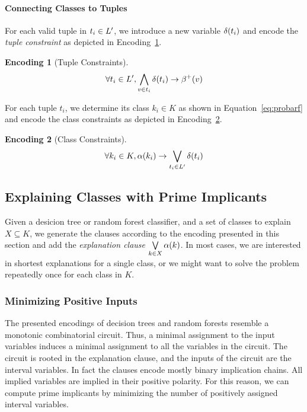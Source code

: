 \documentclass[a4paper, USenglish, cleveref, autoref, thm-restate]{lipics-v2021}
\theoremstyle{definition}
\newtheorem{encoding}{Encoding}[section]
\begin{document}
\paragraph{Connecting Classes to Tuples}

For each valid tuple in $t_i \in L'$, we introduce a new variable $\delta(t_i)$ and encode the \emph{tuple constraint} as depicted in Encoding~\ref{enc:tuple}. 
%
\begin{encoding}[Tuple Constraints]
\label{enc:tuple}
\begin{align*}
\forall t_i \in L', \bigwedge\limits_{v \in t_i} \delta(t_i) \rightarrow \beta^+(v)
\end{align*}
\end{encoding}
%
For each tuple $t_i$, we determine its class $k_i \in K$ as shown in Equation~\ref{eq:probarf} and encode the class constraints as depicted in Encoding~\ref{enc:class-rf}. 
%
\begin{encoding}[Class Constraints]
\label{enc:class-rf}
\begin{align*}
\forall k_i \in K, \alpha(k_i) \rightarrow \bigvee\limits_{t_i \in L'} \delta(t_i)
\end{align*}
\end{encoding}


\subsection{Explaining Classes with Prime Implicants}
\label{sec:approach:pi}

Given a desicion tree or random forest classifier, and a set of classes to explain $X \subseteq K$, we generate the clauses according to the encoding presented in this section and add the \emph{explanation clause} $\bigvee\limits_{k \in X} \alpha(k)$. 
In most cases, we are interested in shortest explanations for a single class, or we might want to solve the problem repeatedly once for each class in $K$. 

\subsubsection{Minimizing Positive Inputs}

The presented encodings of decision trees and random forests resemble a monotonic combinatorial circuit. 
Thus, a minimal assignment to the input variables induces a minimal assignment to all the variables in the circuit. 
The circuit is rooted in the explanation clause, and the inputs of the circuit are the interval variables. 
In fact the clauses encode mostly binary implication chains. 
All implied variables are implied in their positive polarity. 
For this reason, we can compute prime implicants by minimizing the number of positively assigned interval variables. 
\end{document}
